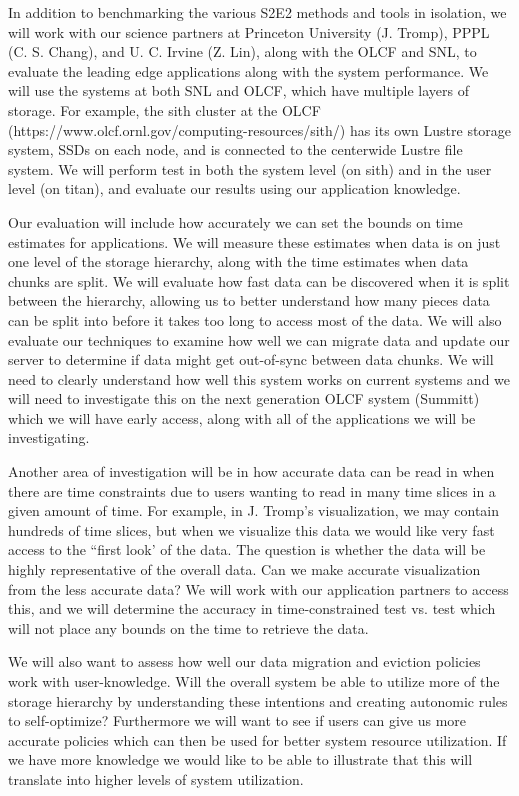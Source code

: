 In addition to benchmarking the various S2E2 methods and tools in isolation,
we will work with our science partners at Princeton University (J. Tromp),
PPPL (C. S. Chang), and U. C. Irvine (Z. Lin), along with the OLCF and SNL,
to evaluate the leading edge applications along with the system performance.
We will use the systems at both SNL and OLCF, which have multiple layers of
storage. For example, the sith cluster at the OLCF
(https://www.olcf.ornl.gov/computing-resources/sith/) has its own Lustre
storage system, SSDs on each node, and is connected to the centerwide Lustre
file system. We will perform test in both the system level (on sith) and in
the user level (on titan), and evaluate our results using our application
knowledge.

Our evaluation will include how accurately we can set the bounds on
time estimates for applications. We will measure these estimates when data
is on just one level of the storage hierarchy, along with the time estimates
when data chunks are split. We will evaluate how fast data can be discovered
when it is split between the hierarchy, allowing us to better understand how
many pieces data can be split into before it takes too long to access most
of the data. We will also evaluate our techniques to examine how well we can
migrate data and update our server to determine if data might get
out-of-sync between data chunks. We will need to clearly understand how well
this system works on current systems and we will need to investigate this on
the next generation OLCF system (Summitt) which we will have early access,
along with all of the applications we will be investigating.

Another area of investigation will be in how accurate data can be read in
when there are time constraints due to users wanting to read in many time
slices in a given amount of time. For example, in J. Tromp's visualization,
we may contain hundreds of time slices, but when we visualize this data we
would like very fast access to the ``first look' of the data. The question
is whether the data will be highly representative of the overall data. Can
we make accurate visualization from the less accurate data? We will work
with our application partners to access this, and we will determine the
accuracy in time-constrained test vs. test which will not place any bounds
on the time to retrieve the data.

We will also want to assess how well our data migration and eviction
policies work with user-knowledge. Will the overall system be able to
utilize more of the storage hierarchy by understanding these intentions and
creating autonomic rules to self-optimize? Furthermore we will want to see
if users can give us more accurate policies which can then be used for
better system resource utilization. If we have more knowledge we would like
to be able to illustrate that this will translate into higher levels of
system utilization.

